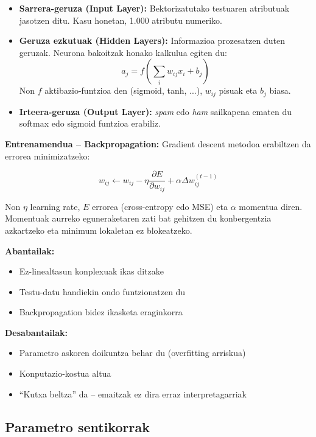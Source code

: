 \documentclass[12pt, a4paper]{article}
\begin{document}
\begin{itemize}
    \item \textbf{Sarrera-geruza (Input Layer):} Bektorizatutako testuaren atributuak
    jasotzen ditu. Kasu honetan, 1.000 atributu numeriko.
    \item \textbf{Geruza ezkutuak (Hidden Layers):} Informazioa prozesatzen duten
    geruzak. Neurona bakoitzak honako kalkulua egiten du:
    \begin{equation}
        a_j = f\!\left(\sum_{i} w_{ij} x_i + b_j\right)
    \end{equation}
    Non $f$ aktibazio-funtzioa den (sigmoid, tanh, ...), $w_{ij}$ pisuak
    eta $b_j$ biasa.
    \item \textbf{Irteera-geruza (Output Layer):} \textit{spam} edo \textit{ham}
    sailkapena ematen du softmax edo sigmoid funtzioa erabiliz.
\end{itemize}

\textbf{Entrenamendua -- Backpropagation:}
Gradient descent metodoa erabiltzen da errorea minimizatzeko:

\begin{equation}
    w_{ij} \leftarrow w_{ij}
    - \eta \frac{\partial E}{\partial w_{ij}}
    + \alpha \Delta w_{ij}^{(t-1)}
\end{equation}

Non $\eta$ learning rate, $E$ errorea (cross-entropy edo MSE) eta
$\alpha$ momentua diren. Momentuak aurreko eguneraketaren zati bat gehitzen
du konbergentzia azkartzeko eta minimum lokaletan ez blokeatzeko.

\textbf{Abantailak:}
\begin{itemize}
    \item Ez-linealtasun konplexuak ikas ditzake
    \item Testu-datu handiekin ondo funtzionatzen du
    \item Backpropagation bidez ikasketa eraginkorra
\end{itemize}

\textbf{Desabantailak:}
\begin{itemize}
    \item Parametro askoren doikuntza behar du (overfitting arriskua)
    \item Konputazio-kostua altua
    \item ``Kutxa beltza'' da -- emaitzak ez dira erraz interpretagarriak
\end{itemize}

\subsection{Parametro sentikorrak}
\end{document}
